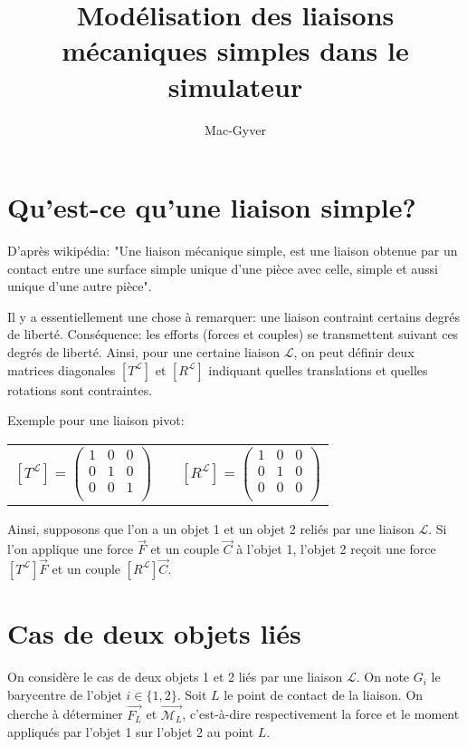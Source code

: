 \documentclass[10pt,a4paper]{llncs}
\title{Modélisation des liaisons mécaniques simples dans le simulateur}
\subtitle{}
\institute{}
\author{Mac-Gyver}
\newcommand{\vect}[1]{\overrightarrow{#1}}
\begin{document}
 
\maketitle
\section{Qu'est-ce qu'une liaison simple?}
D'après wikipédia: "Une liaison mécanique simple, est une liaison obtenue par un contact entre une surface simple unique d'une pièce avec celle, simple et aussi unique d'une autre pièce".

Il y a essentiellement une chose à remarquer: une liaison contraint certains degrés de liberté. Conséquence: les efforts (forces et couples) se transmettent suivant ces degrés de liberté.
Ainsi, pour une certaine liaison $\mathcal{L}$, on peut définir deux matrices diagonales $[T^\mathcal{L}]$ et $[R^\mathcal{L}]$ indiquant quelles translations et quelles rotations sont contraintes.

Exemple pour une liaison pivot:

\begin{center}
\begin{tabular}{ccc}
$[T^\mathcal{L}] = 
\begin{pmatrix}
1&0&0\\
0&1&0\\
0&0&1\\
\end{pmatrix}$
& \hspace{1cm} &
$[R^\mathcal{L}] = 
\begin{pmatrix}
1&0&0\\
0&1&0\\
0&0&0\\
\end{pmatrix}$
\end{tabular}
\end{center}

Ainsi, supposons que l'on a un objet 1 et un objet 2 reliés par une liaison $\mathcal{L}$. Si l'on applique une force $\vect{F}$
et un couple $\vect{C}$ à l'objet 1, l'objet 2 reçoit une force $[T^\mathcal{L}] \vect{F}$ et un couple $[R^\mathcal{L}] \vect{C}$.

\section{Cas de deux objets liés} 

On considère le cas de deux objets 1 et 2 liés par une liaison $\mathcal{L}$.
On note $G_i$ le barycentre de l'objet $i \in \{1,2\}$.
Soit $L$ le point de contact de la liaison. On cherche à déterminer $\vect{F_L}$ et $\vect{\mathcal{M}_L}$,
c'est-à-dire respectivement la force et le moment appliqués par l'objet 1 sur l'objet 2 au point $L$.
\end{document}

